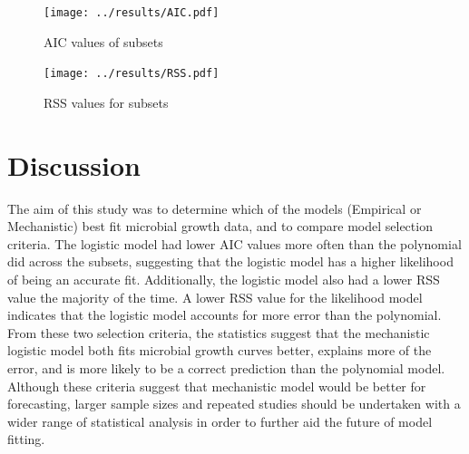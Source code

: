 \documentclass[11pt, titlepage]{article}
\begin{document}
    \begin{figure}[H]
    \centering
    \texttt{[image: ../results/AIC.pdf]}
    \caption{AIC values of subsets}
    \end{figure}

       \begin{figure}[H]
    \centering
    \texttt{[image: ../results/RSS.pdf]}
    \caption{RSS values for subsets}
    \end{figure}

    \section*{Discussion}

	The aim of this study was to determine which of the models (Empirical or Mechanistic) best fit microbial growth data, and to compare model selection criteria. The logistic model had lower AIC values more often than the polynomial did across the subsets, suggesting that the logistic model has a higher likelihood of being an accurate fit. Additionally, the logistic model also had a lower RSS value the majority of the time. A lower RSS value for the likelihood model indicates that the logistic model accounts for more error than the polynomial. From these two selection criteria, the statistics suggest that the mechanistic logistic model both fits microbial growth curves better, explains more of the error, and is more likely to be a correct prediction than the polynomial model. Although these criteria suggest that  mechanistic model would be better for forecasting, larger sample sizes and repeated studies should be undertaken with a wider range of statistical analysis in order to further aid the future of model fitting. 


    

    
\end{document}
